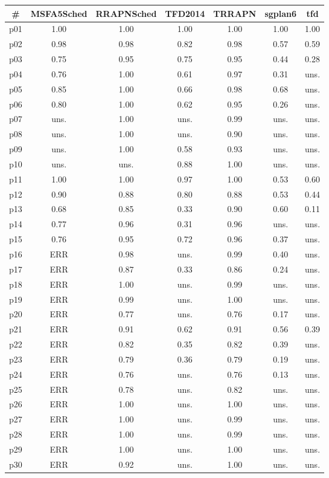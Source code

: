 \begin{tabular}{ccccccc}
\toprule
\textbf{\#} & \textbf{MSFA5Sched} & \textbf{RRAPNSched} & \textbf{TFD2014} & \textbf{TRRAPN} & \textbf{sgplan6} & \textbf{tfd}\\
\midrule
p01 & 1.00 & 1.00 & 1.00 & 1.00 & 1.00 & 1.00\\
p02 & 0.98 & 0.98 & 0.82 & 0.98 & 0.57 & 0.59\\
p03 & 0.75 & 0.95 & 0.75 & 0.95 & 0.44 & 0.28\\
p04 & 0.76 & 1.00 & 0.61 & 0.97 & 0.31 & uns.\\
p05 & 0.85 & 1.00 & 0.66 & 0.98 & 0.68 & uns.\\
p06 & 0.80 & 1.00 & 0.62 & 0.95 & 0.26 & uns.\\
p07 & uns. & 1.00 & uns. & 0.99 & uns. & uns.\\
p08 & uns. & 1.00 & uns. & 0.90 & uns. & uns.\\
p09 & uns. & 1.00 & 0.58 & 0.93 & uns. & uns.\\
p10 & uns. & uns. & 0.88 & 1.00 & uns. & uns.\\
p11 & 1.00 & 1.00 & 0.97 & 1.00 & 0.53 & 0.60\\
p12 & 0.90 & 0.88 & 0.80 & 0.88 & 0.53 & 0.44\\
p13 & 0.68 & 0.85 & 0.33 & 0.90 & 0.60 & 0.11\\
p14 & 0.77 & 0.96 & 0.31 & 0.96 & uns. & uns.\\
p15 & 0.76 & 0.95 & 0.72 & 0.96 & 0.37 & uns.\\
p16 & ERR & 0.98 & uns. & 0.99 & 0.40 & uns.\\
p17 & ERR & 0.87 & 0.33 & 0.86 & 0.24 & uns.\\
p18 & ERR & 1.00 & uns. & 0.99 & uns. & uns.\\
p19 & ERR & 0.99 & uns. & 1.00 & uns. & uns.\\
p20 & ERR & 0.77 & uns. & 0.76 & 0.17 & uns.\\
p21 & ERR & 0.91 & 0.62 & 0.91 & 0.56 & 0.39\\
p22 & ERR & 0.82 & 0.35 & 0.82 & 0.39 & uns.\\
p23 & ERR & 0.79 & 0.36 & 0.79 & 0.19 & uns.\\
p24 & ERR & 0.76 & uns. & 0.76 & 0.13 & uns.\\
p25 & ERR & 0.78 & uns. & 0.82 & uns. & uns.\\
p26 & ERR & 1.00 & uns. & 1.00 & uns. & uns.\\
p27 & ERR & 1.00 & uns. & 0.99 & uns. & uns.\\
p28 & ERR & 1.00 & uns. & 0.99 & uns. & uns.\\
p29 & ERR & 1.00 & uns. & 1.00 & uns. & uns.\\
p30 & ERR & 0.92 & uns. & 1.00 & uns. & uns.\\
\bottomrule
\end{tabular}

